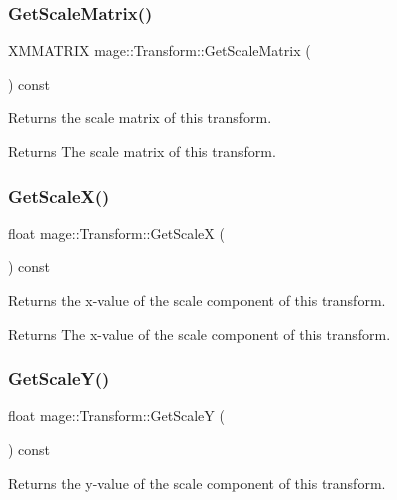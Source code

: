 \subsubsection{\texorpdfstring{Get\+Scale\+Matrix()}{GetScaleMatrix()}}
{\footnotesize\ttfamily X\+M\+M\+A\+T\+R\+IX mage\+::\+Transform\+::\+Get\+Scale\+Matrix (\begin{DoxyParamCaption}{ }\end{DoxyParamCaption}) const}

Returns the scale matrix of this transform.

\begin{DoxyReturn}{Returns}
The scale matrix of this transform. 
\end{DoxyReturn}
\hypertarget{structmage_1_1_transform_a3a82465d40dde6b98ca274a8de061545}{}\label{structmage_1_1_transform_a3a82465d40dde6b98ca274a8de061545} 
\subsubsection{\texorpdfstring{Get\+Scale\+X()}{GetScaleX()}}
{\footnotesize\ttfamily float mage\+::\+Transform\+::\+Get\+ScaleX (\begin{DoxyParamCaption}{ }\end{DoxyParamCaption}) const}

Returns the x-\/value of the scale component of this transform.

\begin{DoxyReturn}{Returns}
The x-\/value of the scale component of this transform. 
\end{DoxyReturn}
\hypertarget{structmage_1_1_transform_acbd677fa7e27cb15d205ac8354d8624a}{}\label{structmage_1_1_transform_acbd677fa7e27cb15d205ac8354d8624a} 
\subsubsection{\texorpdfstring{Get\+Scale\+Y()}{GetScaleY()}}
{\footnotesize\ttfamily float mage\+::\+Transform\+::\+Get\+ScaleY (\begin{DoxyParamCaption}{ }\end{DoxyParamCaption}) const}

Returns the y-\/value of the scale component of this transform.


